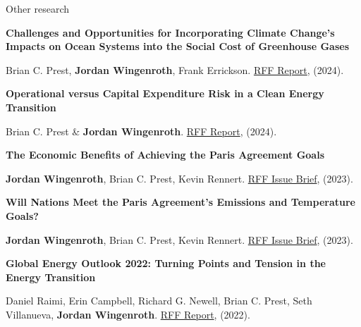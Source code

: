 \documentclass{resume} %
\begin{document}
\begin{rSection}{Other research}

{\bf Challenges and Opportunities for Incorporating Climate Change’s Impacts on Ocean Systems into the Social Cost of Greenhouse Gases}
\vspace{-7pt}
\begin{adjustwidth}{12pt}{}
{\small Brian C. Prest, \textbf{Jordan Wingenroth}, Frank Errickson. \href{https://www.rff.org/publications/reports/challenges-and-opportunities-for-incorporating-climate-changes-impacts-on-ocean-systems-into-the-social-cost-of-greenhouse-gases/}{RFF Report}, (2024).}
\end{adjustwidth}

{\bf Operational versus Capital Expenditure Risk in a Clean Energy Transition}
\vspace{-7pt}
\begin{adjustwidth}{12pt}{}
{\small Brian C. Prest \& \textbf{Jordan Wingenroth}. \href{https://www.rff.org/publications/reports/operational-versus-capital-expenditure-risk-in-a-clean-energy-transition/}{RFF Report}, (2024).}
\end{adjustwidth}

{\bf The Economic Benefits of Achieving the Paris Agreement Goals}
\vspace{-7pt}
\begin{adjustwidth}{12pt}{}
{\small \textbf{Jordan Wingenroth}, Brian C. Prest, Kevin Rennert. \href{https://www.rff.org/publications/issue-briefs/the-economic-benefits-of-achieving-the-paris-agreement-goals/}{RFF Issue Brief}, (2023).}
\end{adjustwidth}

{\bf Will Nations Meet the Paris Agreement's Emissions and Temperature Goals?}
\vspace{-7pt}
\begin{adjustwidth}{12pt}{}
{\small \textbf{Jordan Wingenroth}, Brian C. Prest, Kevin Rennert. \href{https://www.rff.org/publications/issue-briefs/will-nations-meet-the-paris-agreements-emissions-and-temperature-goals/}{RFF Issue Brief}, (2023).}
\end{adjustwidth}

{\bf Global Energy Outlook 2022: Turning Points and Tension in the Energy Transition}
\vspace{-7pt}
\begin{adjustwidth}{12pt}{}
{\small Daniel Raimi, Erin Campbell, Richard G. Newell, Brian C. Prest, Seth Villanueva, \textbf{Jordan Wingenroth}. \href{https://www.rff.org/publications/reports/global-energy-outlook-2022/}{RFF Report}, (2022).}
\end{adjustwidth}


\end{rSection}
\end{document}
